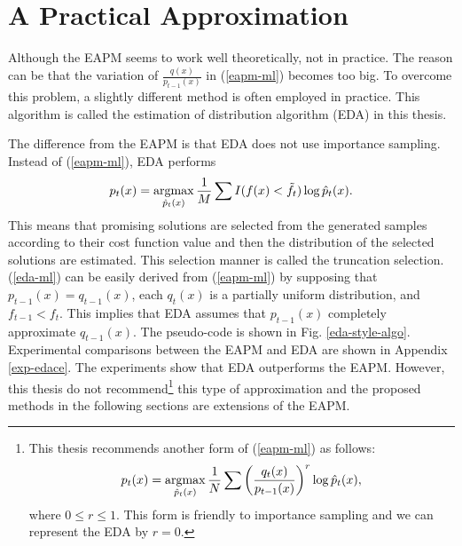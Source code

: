 \section{A  Practical Approximation}
Although the EAPM seems to work well theoretically,
not in practice. 
The reason can be that
the variation of $\frac{q(x)}{p_{t-1}(x)}$ in (\ref{eapm-ml})
becomes too big.
To overcome this problem,
a slightly different method is often employed in practice.
This algorithm is called the estimation of distribution algorithm (EDA) in
this thesis. 

The difference from the EAPM is that
EDA does not use importance sampling.
Instead of (\ref{eapm-ml}), 
EDA performs
\begin{equation}
  p_{t}(x)=\mathop{\rm argmax}\limits_{\hat p_{t}(x)} \frac{1}{M} \sum I(f(x)<\tilde f_t)\log
  \hat p_{t}(x).
\label{eda-ml}
\end{equation}
This means that promising solutions are selected from the
generated samples according to their cost function value
and
then the distribution of the selected solutions are estimated.
This selection manner is called the truncation selection.
(\ref{eda-ml}) can be easily derived from (\ref{eapm-ml}) by
supposing that $p_{t-1}(x)=q_{t-1}(x)$,
each $q_{t}(x)$ is a partially uniform distribution, and $f_{t-1}<f_t$.
This implies that EDA assumes that $p_{t-1}(x)$ 
completely approximate $q_{t-1}(x)$.
The pseudo-code is shown in Fig. \ref{eda-style-algo}.
Experimental comparisons between the EAPM and EDA are 
shown in Appendix \ref{exp-edace}.
The experiments show that EDA outperforms the EAPM.
However,
this thesis do not recommend\footnote{
This thesis recommends another form of (\ref{eapm-ml}) as follows:
\begin{equation}
 p_{t}(x)=\mathop{\rm argmax}\limits_{\hat p_{t}(x)} \frac{1}{N} \sum 
\left(
\frac{q_t(x)}{p_{t-1}(x)}
\right)^r
\log \hat p_{t}(x),
\label{aeapm-ml}
\end{equation}
where $0 \leq r \leq 1$.
This form is friendly to importance sampling and
we can represent the EDA by $r=0$.
}
 this type of approximation
and the proposed methods in the following sections are
extensions of the EAPM.


